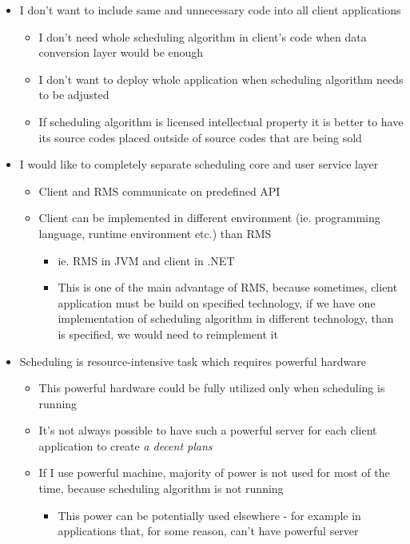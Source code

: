 \begin{itemize}
    \item I don't want to include same and unnecessary code into all client applications
    \begin{itemize}
        \item I don't need whole scheduling algorithm in client's code when data conversion layer would be enough
        \item I don't want to deploy whole application when scheduling algorithm needs to be adjusted
        \item If scheduling algorithm is licensed intellectual property it is better to have its source codes placed outside of source codes that are being sold
    \end{itemize}
    \item I would like to completely separate scheduling core and user service layer
    \begin{itemize}
        \item Client and RMS communicate on predefined API
        \item Client can be implemented in different environment (ie.
        programming language, runtime environment etc.) than RMS
        \begin{itemize}
            \item ie.
            RMS in JVM and client in .NET
            \item This is one of the main advantage of RMS, because sometimes, client application must be build on specified technology, if we have
            one implementation of scheduling algorithm in different technology, than is specified, we would need to reimplement it
        \end{itemize}
    \end{itemize}
    \item Scheduling is resource-intensive task which requires powerful hardware
    \begin{itemize}
        \item This powerful hardware could be fully utilized only when scheduling is running
        \item It's not always possible to have such a powerful server for each client application to create \textit{a decent plans}
        \item If I use powerful machine, majority of power is not used for most of the time, because scheduling algorithm is not running
        \begin{itemize}
            \item This power can be potentially used elsewhere - for example in applications that, for some reason, can't have powerful server

\end{itemize}
\end{itemize}
\end{itemize}
